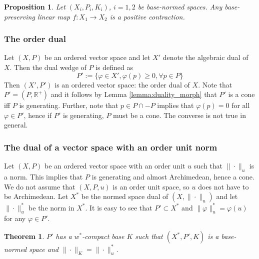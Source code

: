 \documentclass[12pt]{article}
\newtheorem{thm}{Theorem}
\newtheorem{prop}{Proposition}
\theoremstyle{remark}
\newcommand{\<}{\langle}
\begin{document}
\begin{prop} Let $(X_i,P_i,K_i)$, $i=1,2$ be base-normed spaces. Any base-preserving linear  map $f:X_1\to X_2$ is a positive contraction.
\end{prop}




\subsubsection*{The order dual}

Let $(X,P)$ be an ordered vector space and let $X'$ denote the algebraic dual of $X$. Then the dual wedge of $P$ is defined as
\[
P':=\{\varphi\in X', \varphi(p)\ge 0, \forall p\in P\}
\]
Then $(X',P')$ is an ordered vector space: the order dual of $X$. Note that  $P'=(P,\mathbb R^+)$ and it follows by  Lemma \ref{lemma:duality_morph} that 
	$P'$ is a cone iff $P$ is generating. Further, note that $p\in P\cap -P$ implies that $\varphi(p)=0$ for all $\varphi\in P'$, hence if $P'$ is generating, $P$ must be a cone. The converse is not true in general.


\subsubsection*{The dual of a vector space with an order unit norm} 

Let $(X,P)$ be an ordered vector space with an order unit $u$ such that $\|\cdot \|_u$ is a norm. This implies that $P$ is generating and almost Archimedean, hence a cone. We do not assume that $(X,P,u)$ is an order unit space, so $u$ does not have to be Archimedean. Let $X^*$ be the normed space dual of $(X, \|\cdot\|_u)$ and let $\|\cdot\|_u^*$ be the norm in $X^*$. 
It is easy to see that  $ P'\subset X^*$ and $\|\varphi\|_u^*=\varphi(u)$ for any $\varphi\in P'$.



\begin{thm} $P'$  has a $w^*$-compact base $K$ such that  $(X^*,P',K)$ is a base-normed space and $\|\cdot\|_K=\|\cdot\|_u^*$. 

\end{thm}
\end{document}
